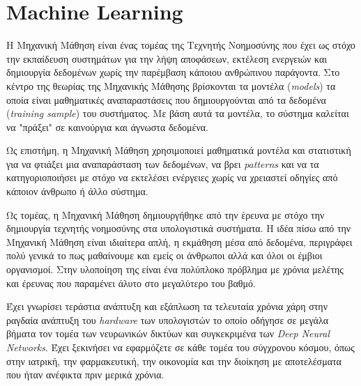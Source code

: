 \thispagestyle{empty}

\chapter{Machine Learning}

Η Μηχανική Μάθηση είναι ένας τομέας της Τεχνητής Νοημοσύνης που έχει ως στόχο την εκπαίδευση συστημάτων για την λήψη αποφάσεων, εκτέλεση ενεργειών και δημιουργία δεδομένων χωρίς την παρέμβαση κάποιου ανθρώπινου παράγοντα. Στο κέντρο της θεωρίας της Μηχανικής Μάθησης βρίσκονται τα μοντέλα (\textit{models}) τα οποία είναι μαθηματικές αναπαραστάσεις που δημιουργούνται από τα δεδομένα (\textit{training sample}) του συστήματος. Με βάση αυτά τα μοντέλα, το σύστημα καλείται να "πράξει" σε καινούργια και άγνωστα δεδομένα.
\par
Ως επιστήμη, η Μηχανική Μάθηση χρησιμοποιεί μαθηματικά μοντέλα και στατιστική για να φτιάξει μια αναπαράσταση των δεδομένων, να βρει \textit{patterns} και να τα κατηγοριοποιήσει με στόχο να εκτελέσει ενέργειες χωρίς να χρειαστεί οδηγίες από κάποιον άνθρωπο ή άλλο σύστημα.
\par
Ως τομέας, η Μηχανική Μάθηση δημιουργήθηκε από την έρευνα με στόχο την δημιουργία τεχνητής νοημοσύνης στα υπολογιστικά συστήματα. Η ιδέα πίσω από την Μηχανική Μάθηση είναι ιδιαίτερα απλή, η εκμάθηση μέσα από δεδομένα, περιγράφει πολύ γενικά το πως μαθαίνουμε και εμείς οι άνθρωποι αλλά και όλοι οι έμβιοι οργανισμοί. Στην υλοποίηση της είναι ένα πολύπλοκο πρόβλημα με χρόνια μελέτης και έρευνας που παραμένει άλυτο στο μεγαλύτερο του βαθμό.
\par
Έχει γνωρίσει τεράστια ανάπτυξη και εξάπλωση τα τελευταία χρόνια χάρη στην ραγδαία ανάπτυξη του \textit{hardware} των υπολογιστών το οποίο οδήγησε σε μεγάλα βήματα τον τομέα των νευρωνικών δικτύων και συγκεκριμένα των \textit{Deep Neural Networks}. Έχει ξεκινήσει να εφαρμόζετε σε κάθε τομέα του σύγχρονου κόσμου, όπως στην ιατρική, την φαρμακευτική, την οικονομία και την διοίκηση με αποτελέσματα που ήταν ανέφικτα πριν μερικά χρόνια. \cite{mlintro}


